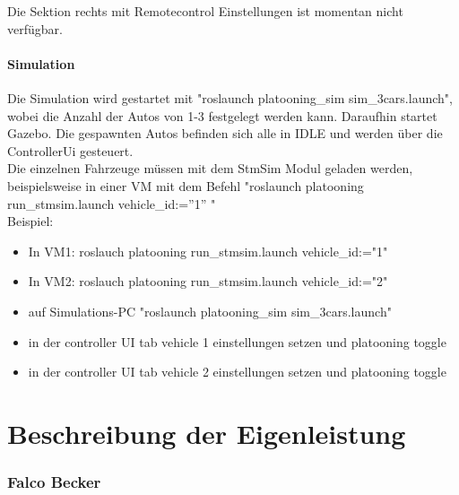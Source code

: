 \documentclass[a4paper, 12pt, titlepage]{scrartcl}
\begin{document}
{	Die Sektion rechts mit Remotecontrol Einstellungen ist momentan nicht verfügbar.

	\subsection*{Simulation}
	Die Simulation wird gestartet mit "roslaunch platooning\_sim sim\_3cars.launch", wobei die Anzahl der Autos von 1-3 festgelegt werden kann. Daraufhin startet Gazebo. Die gespawnten Autos befinden sich alle in IDLE und werden über die ControllerUi gesteuert.\\

	Die einzelnen Fahrzeuge müssen mit dem StmSim Modul geladen werden, beispielsweise in einer VM mit dem Befehl "roslaunch platooning run\_stmsim.launch vehicle\_id:=''1'' "\\

	Beispiel:\\
	\begin{itemize}
		\item In VM1: roslauch platooning run\_stmsim.launch vehicle\_id:="1"
		\item In VM2: roslauch platooning run\_stmsim.launch vehicle\_id:="2"
		\item auf Simulations-PC "roslaunch platooning\_sim sim\_3cars.launch"
		\item in der controller UI tab vehicle 1 einstellungen setzen und platooning toggle
		\item in der controller UI tab vehicle 2 einstellungen setzen und platooning toggle
	\end{itemize}

\newpage
\part{Beschreibung der Eigenleistung}
\label{eigenleistung}
	\section{Falco Becker}
}
\end{document}
